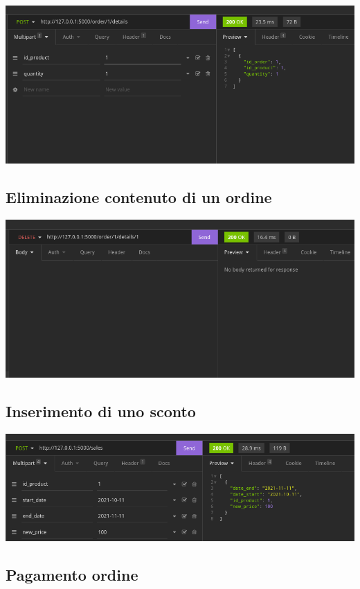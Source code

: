\includegraphics[scale=0.45]{images/inserimento_contenuto.png}

\subsection{Eliminazione contenuto di un ordine}

\includegraphics[scale=0.45]{images/cancellazione_contenuto.png}

\subsection{Inserimento di uno sconto}

\includegraphics[scale=0.45]{images/inserimento_sconto.png}

\subsection{Pagamento ordine}

